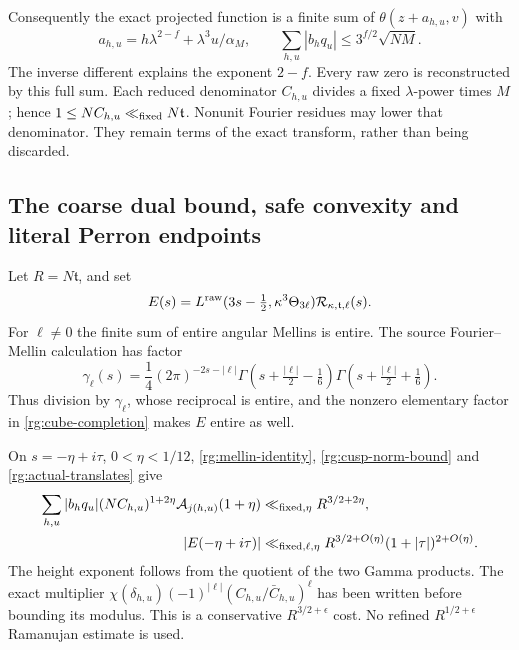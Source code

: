 Consequently the exact projected function is a finite sum of
\(\theta(z+a_{h,u},v)\) with
\begin{equation}\label{rg:actual-translates}
 a_{h,u}=h\lambda^{2-f}+\lambda^3u/\alpha_M,\qquad
 \sum_{h,u}|b_hq_u|\le3^{f/2}\sqrt{NM}.
\end{equation}
The inverse different explains the exponent \(2-f\).
Every raw zero is reconstructed by this full sum.
Each reduced denominator \(C_{h,u}\) divides a fixed
\(\lambda\)-power times \(M\); hence
\(1\le NC_{h,u}\ll_{\rm fixed}N\mathfrak t\).
Nonunit Fourier residues may lower that denominator. They remain
terms of the exact transform, rather than being discarded.

\subsection{The coarse dual bound, safe convexity and literal Perron endpoints}
\label{rg:sharp-proof}
Let \(R=N\mathfrak t\), and set
\[
 E(s)=L^{\rm raw}(3s-\tfrac12,\kappa^3\Theta_{3\ell})
                                  \mathcal R_{\kappa,\mathfrak t,\ell}(s).
\]
For \(\ell\ne0\) the finite sum of entire angular Mellins is entire.
The source Fourier--Mellin calculation has factor
\begin{equation}\label{rg:gamma-factor}
 \gamma_\ell(s)=\frac14(2\pi)^{-2s-|\ell|}
 \Gamma(s+\tfrac{|\ell|}{2}-\tfrac16)
 \Gamma(s+\tfrac{|\ell|}{2}+\tfrac16).
\end{equation}
Thus division by \(\gamma_\ell\), whose reciprocal is entire,
and the nonzero elementary factor in \eqref{rg:cube-completion}
makes \(E\) entire as well.

On \(s=-\eta+i\tau\), \(0<\eta<1/12\),
\eqref{rg:mellin-identity}, \eqref{rg:cusp-norm-bound} and
\eqref{rg:actual-translates} give
\begin{equation}\label{rg:dual-mass}
 \begin{split}
 \sum_{h,u}|b_hq_u|(NC_{h,u})^{1+2\eta}
                  \mathcal A_{j(h,u)}(1+\eta)
 &\ll_{\rm fixed,\eta} R^{3/2+2\eta},\\
 |E(-\eta+i\tau)|
 &\ll_{\rm fixed,\ell,\eta}
 R^{3/2+O(\eta)}(1+|\tau|)^{2+O(\eta)} .
 \end{split}
\end{equation}
The height exponent follows from the quotient of the two Gamma
products. The exact multiplier
\(\chi(\delta_{h,u})(-1)^{|\ell|}
 (C_{h,u}/\bar C_{h,u})^\ell\)
has been written before bounding its modulus.
This is a conservative \(R^{3/2+\epsilon}\) cost.
No refined \(R^{1/2+\epsilon}\) Ramanujan estimate is used.

